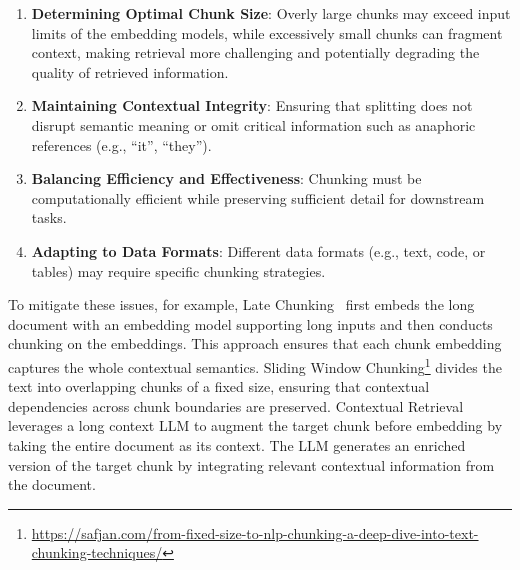 \documentclass[11pt, a4paper, logo, copyright, nonumbering]{map}
\begin{document}
\begin{enumerate}
    \item \textbf{Determining Optimal Chunk Size}: Overly large chunks may exceed input limits of the embedding models, while excessively small chunks can fragment context, making retrieval more challenging and potentially degrading the quality of retrieved information.
    \item \textbf{Maintaining Contextual Integrity}: Ensuring that splitting does not disrupt semantic meaning or omit critical information such as anaphoric references (e.g., ``it'', ``they'').
    \item \textbf{Balancing Efficiency and Effectiveness}: Chunking must be computationally efficient while preserving sufficient detail for downstream tasks.
    \item \textbf{Adapting to Data Formats}: Different data formats (e.g., text, code, or tables) may require specific chunking strategies.
\end{enumerate}

To mitigate these issues, 
for example, 
Late Chunking~\citep{günther2024late} first embeds the long document with an embedding model supporting long inputs and then conducts chunking on the embeddings. This approach ensures that each chunk embedding captures the whole contextual semantics. 
Sliding Window Chunking\footnote{\url{https://safjan.com/from-fixed-size-to-nlp-chunking-a-deep-dive-into-text-chunking-techniques/}} divides the text into overlapping chunks of a fixed size, ensuring that contextual dependencies across chunk boundaries are preserved. 
Contextual Retrieval~\citep{contextual-retrieval} leverages a long context LLM to augment the target chunk before embedding by taking the entire document as its context. The LLM generates an enriched version of the target chunk by integrating relevant contextual information from the document.
\end{document}
